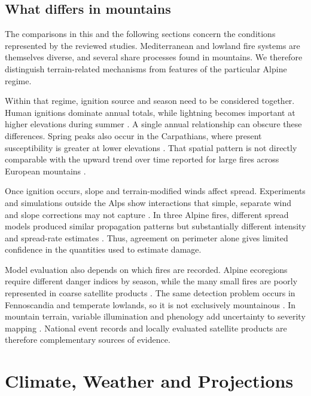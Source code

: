 \documentclass[11pt,a4paper]{article}
\begin{document}
\subsection{What differs in mountains}

The comparisons in this and the following sections concern the conditions represented by the reviewed studies. Mediterranean and lowland fire systems are themselves diverse, and several share processes found in mountains. We therefore distinguish terrain-related mechanisms from features of the particular Alpine regime.

Within that regime, ignition source and season need to be considered together. Human ignitions dominate annual totals, while lightning becomes important at higher elevations during summer \citep{vacchiano_modeling_2018, conedera_lightninginduced_2006}. A single annual relationship can obscure these differences. Spring peaks also occur in the Carpathians, where present susceptibility is greater at lower elevations \citep{manczinger_fire_2025}. That spatial pattern is not directly comparable with the upward trend over time reported for large fires across European mountains \citep{beloiu_climatedriven_2026}.

Once ignition occurs, slope and terrain-modified winds affect spread. Experiments and simulations outside the Alps show interactions that simple, separate wind and slope corrections may not capture \citep{hayajneh_wind_2026, ozaki_impact_2022}. In three Alpine fires, different spread models produced similar propagation patterns but substantially different intensity and spread-rate estimates \citep{malanchini_modeling_2025}. Thus, agreement on perimeter alone gives limited confidence in the quantities used to estimate damage.

Model evaluation also depends on which fires are recorded. Alpine ecoregions require different danger indices by season, while the many small fires are poorly represented in coarse satellite products \citep{arpaci_selecting_2013, muller_forest_2020}. The same detection problem occurs in Fennoscandia and temperate lowlands, so it is not exclusively mountainous \citep{bakke_datadriven_2023, stoof_temperate_2024}. In mountain terrain, variable illumination and phenology add uncertainty to severity mapping \citep{morresi_mapping_2022}. National event records and locally evaluated satellite products are therefore complementary sources of evidence.

\section{Climate, Weather and Projections}
\label{sec:climate}
\end{document}
